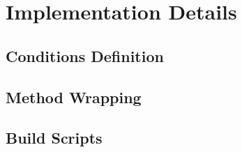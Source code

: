 \section{Implementation Details}\label{sec:implementation_details}


\subsection[ ]{Conditions Definition}\label{subsec:when_macro}

\begin{frame}{\secname}
	\framesubtitle{\subsecname}
	\lipsum[1-1]
\end{frame}


\subsection[ ]{Method Wrapping}\label{subsec:spec_macro}

\begin{frame}{\secname}
	\framesubtitle{\subsecname}
	\lipsum[1-1]
\end{frame}


\subsection[ ]{Build Scripts}\label{subsec:build_scripts}

\begin{frame}{\secname}
	\framesubtitle{\subsecname}
	\lipsum[1-1]
\end{frame}